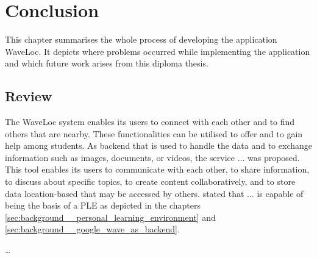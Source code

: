 \chapter{Conclusion}
\label{cha:conclusion}


This chapter summarises the whole process of developing the application WaveLoc. It depicts where problems occurred while implementing the application and which future work arises from this diploma thesis. 


\section{Review}
\label{sec:conclusion__review}

The  WaveLoc system enables its users to connect with each other and to find others that are nearby. These functionalities can be utilised to offer and to gain help among students. As backend that is used to handle the data and to exchange information such as images, documents, or videos, the service ... was proposed. This tool enables its users to communicate with each other, to share information, to discuss about specific topics, to create content collaboratively, and to store data location-based that may be accessed by others. \citet{ms2010} stated that ... is capable of being the basis of a PLE as depicted in the chapters \ref{sec:background__personal_learning_environment} and \ref{sec:background__google_wave_as_backend}.

\ldots{}